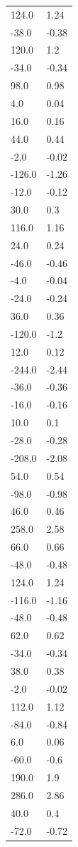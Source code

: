 \begin{longtable}{ll}
124.0 & 1.24 \\
-38.0 & -0.38 \\
120.0 & 1.2 \\
-34.0 & -0.34 \\
98.0 & 0.98 \\
4.0 & 0.04 \\
16.0 & 0.16 \\
44.0 & 0.44 \\
-2.0 & -0.02 \\
-126.0 & -1.26 \\
-12.0 & -0.12 \\
30.0 & 0.3 \\
116.0 & 1.16 \\
24.0 & 0.24 \\
-46.0 & -0.46 \\
-4.0 & -0.04 \\
-24.0 & -0.24 \\
36.0 & 0.36 \\
-120.0 & -1.2 \\
12.0 & 0.12 \\
-244.0 & -2.44 \\
-36.0 & -0.36 \\
-16.0 & -0.16 \\
10.0 & 0.1 \\
-28.0 & -0.28 \\
-208.0 & -2.08 \\
54.0 & 0.54 \\
-98.0 & -0.98 \\
46.0 & 0.46 \\
258.0 & 2.58 \\
66.0 & 0.66 \\
-48.0 & -0.48 \\
124.0 & 1.24 \\
-116.0 & -1.16 \\
-48.0 & -0.48 \\
62.0 & 0.62 \\
-34.0 & -0.34 \\
38.0 & 0.38 \\
-2.0 & -0.02 \\
112.0 & 1.12 \\
-84.0 & -0.84 \\
6.0 & 0.06 \\
-60.0 & -0.6 \\
190.0 & 1.9 \\
286.0 & 2.86 \\
40.0 & 0.4 \\
-72.0 & -0.72 \\

\end{longtable}
